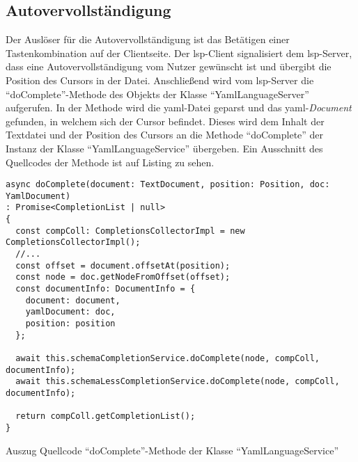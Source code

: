 \subsection{Autovervollständigung}

Der Auslöser für die Autovervollständigung ist das Betätigen einer Tastenkombination auf der Clientseite. Der \ac{lsp}-Client signalisiert dem \ac{lsp}-Server,
dass eine Autovervollständigung vom Nutzer gewünscht ist und übergibt die Position des Cursors in der Datei.
Anschließend wird vom \ac{lsp}-Server die ``doComplete''-Methode des Objekts der Klasse ``YamlLanguageServer'' aufgerufen.
In der Methode wird die \ac{yaml}-Datei geparst und das \ac{yaml}-\textit{Document} gefunden, in welchem sich der Cursor befindet.
Dieses wird dem Inhalt der Textdatei und der Position des Cursors an die Methode ``doComplete'' der Instanz der Klasse ``YamlLanguageService'' übergeben.
Ein Ausschnitt des Quellcodes der Methode ist auf Listing zu sehen.

\begin{listing}[htp]
      \begin{verbatim}
async doComplete(document: TextDocument, position: Position, doc: YamlDocument)
: Promise<CompletionList | null> 
{
  const compColl: CompletionsCollectorImpl = new CompletionsCollectorImpl();
  //...
  const offset = document.offsetAt(position);
  const node = doc.getNodeFromOffset(offset);
  const documentInfo: DocumentInfo = {
    document: document,
    yamlDocument: doc,
    position: position
  };

  await this.schemaCompletionService.doComplete(node, compColl, documentInfo);
  await this.schemaLessCompletionService.doComplete(node, compColl, documentInfo);

  return compColl.getCompletionList();
}
      \end{verbatim}
      \caption{Auszug Quellcode ``doComplete''-Methode der Klasse ``YamlLanguageService''}
      \label{lst:do-complete-yaml-language-service}
\end{listing}

